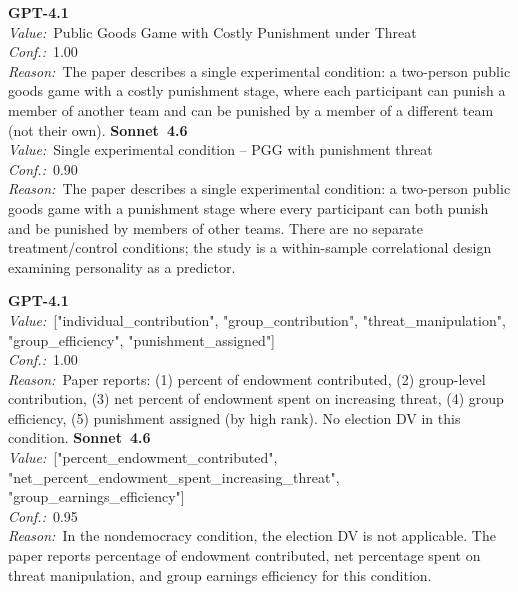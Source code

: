 \documentclass[11pt,a4paper]{article}
\begin{document}
\begin{tcolorbox}[
  title={\textbf{data\_id} \textbar{} DOI: 10.1016\_j.jrp.2019.05.005 \textbar{} Cond.~0},
  colback=blue!3!white,
  colframe=blue!45!black,
  fonttitle=\small\sffamily,
  sidebyside,
  sidebyside align=top seam,
  lower separated=false,
  breakable,
  before upper={\small},
  before lower={\small},
]
\textbf{GPT-4.1}\\[2pt]
\textit{Value:}~Public Goods Game with Costly Punishment under Threat\\[3pt]
\textit{Conf.:}~1.00\\[3pt]
\textit{Reason:}~The paper describes a single experimental condition: a two-person public goods game with a costly punishment stage, where each participant can punish a member of another team and can be punished by a member of a different team (not their own).
\tcblower
\textbf{Sonnet~4.6}\\[2pt]
\textit{Value:}~Single experimental condition -- PGG with punishment threat\\[3pt]
\textit{Conf.:}~0.90\\[3pt]
\textit{Reason:}~The paper describes a single experimental condition: a two-person public goods game with a punishment stage where every participant can both punish and be punished by members of other teams. There are no separate treatment/control conditions; the study is a within-sample correlational design examining personality as a predictor.
\end{tcolorbox}

\begin{tcolorbox}[
  title={\textbf{DVs} \textbar{} DOI: 10.1111\_ssqu.12910 \textbar{} Cond.~1},
  colback=blue!3!white,
  colframe=blue!45!black,
  fonttitle=\small\sffamily,
  sidebyside,
  sidebyside align=top seam,
  lower separated=false,
  breakable,
  before upper={\small},
  before lower={\small},
]
\textbf{GPT-4.1}\\[2pt]
\textit{Value:}~["individual\_contribution", "group\_contribution", "threat\_manipulation", "group\_efficiency", "punishment\_assigned"]\\[3pt]
\textit{Conf.:}~1.00\\[3pt]
\textit{Reason:}~Paper reports: (1) percent of endowment contributed, (2) group-level contribution, (3) net percent of endowment spent on increasing threat, (4) group efficiency, (5) punishment assigned (by high rank). No election DV in this condition.
\tcblower
\textbf{Sonnet~4.6}\\[2pt]
\textit{Value:}~["percent\_endowment\_contributed", "net\_percent\_endowment\_spent\_increasing\_threat", "group\_earnings\_efficiency"]\\[3pt]
\textit{Conf.:}~0.95\\[3pt]
\textit{Reason:}~In the nondemocracy condition, the election DV is not applicable. The paper reports percentage of endowment contributed, net percentage spent on threat manipulation, and group earnings efficiency for this condition.
\end{tcolorbox}
\end{document}
